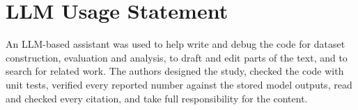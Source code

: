 \section*{LLM Usage Statement}
 An LLM-based assistant was used to help write and debug the code for dataset construction, evaluation and analysis, to draft and edit parts of the text, and to search for related work. The authors designed the study, checked the code with unit tests, verified every reported number against the stored model outputs, read and checked every citation, and take full responsibility for the content.
